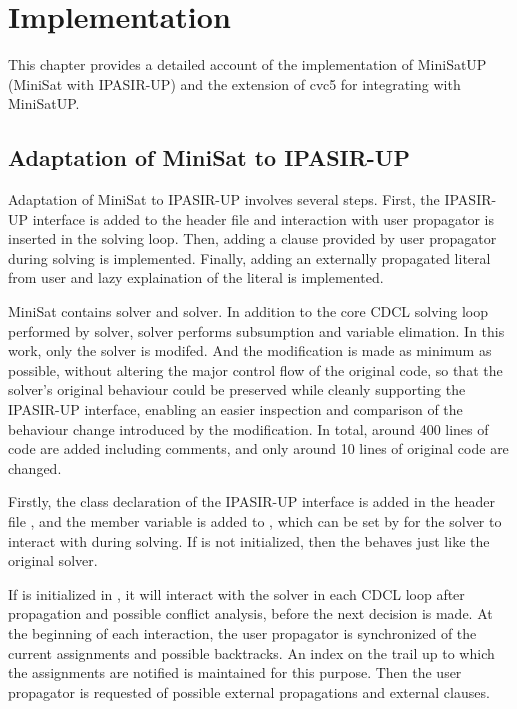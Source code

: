 \chapter{Implementation}

This chapter provides a detailed account of the implementation of MiniSatUP (MiniSat with IPASIR-UP) and the extension of cvc5 for integrating with MiniSatUP.

\section{Adaptation of MiniSat to IPASIR-UP}

Adaptation of MiniSat to IPASIR-UP involves several steps. First, the IPASIR-UP interface is added to the header file and interaction with user propagator is inserted in the solving loop. Then, adding a clause provided by user propagator during solving is implemented. Finally, adding an externally propagated literal from user and lazy explaination of the literal is implemented.

MiniSat contains  solver and  solver. In addition to the core CDCL solving loop performed by  solver,  solver performs subsumption and variable elimation. In this work, only the  solver is modifed. And the modification is made as minimum as possible, without altering the major control flow of the original code, so that the solver's original behaviour could be preserved while cleanly supporting the IPASIR-UP interface, enabling an easier inspection and comparison of the behaviour change introduced by the modification. In total, around 400 lines of code are added including comments, and only around 10 lines of original code are changed.

Firstly, the  class declaration of the IPASIR-UP interface is added in the header file , and the  member variable is added to , which can be set by  for the solver to interact with during solving. If  is not initialized, then the  behaves just like the original solver.

If  is initialized in , it will interact with the solver in each CDCL loop after propagation and possible conflict analysis, before the next decision is made. At the beginning of each interaction, the user propagator is synchronized of the current assignments and possible backtracks. An index on the trail up to which the assignments are notified is maintained for this purpose. Then the user propagator is requested of possible external propagations and external clauses.

